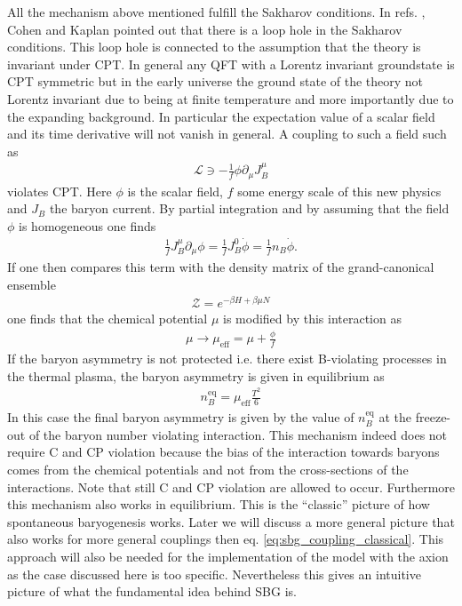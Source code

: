 \documentclass[13pt,a4paper,titlepage]{article}
\begin{document}
All the mechanism above mentioned fulfill the Sakharov conditions.
In refs. \cite{COHEN1987251}, \cite{COHEN1988913} Cohen and Kaplan pointed out that there is a loop hole in the Sakharov conditions.
This loop hole is connected to the assumption that the theory is invariant under CPT.
In general any QFT with a Lorentz invariant groundstate is CPT symmetric but in the early universe the ground state of the theory not Lorentz invariant due to being at finite temperature and more importantly
due to the expanding background. In particular the expectation value of a scalar field and its time derivative will not vanish in general. A coupling to such a field such as \cite[eq. 1.2]{COHEN1987251}
\begin{align}
    \label{eq:sbg_coupling_classical}
    \mathcal{L} \ni - \frac{1}{f} \phi \partial_\mu J^\mu_B
\end{align}
violates CPT. Here $\phi$ is the scalar field, $f$ some energy scale of this new physics and $J_B$ the baryon current.
By partial integration and by assuming that the field $\phi$ is homogeneous one finds \cite[1.3]{COHEN1987251}
\begin{align}
    \frac{1}{f} J_B^\mu \partial_\mu \phi = \frac{1}{f} J_B^0 \dot{\phi}
    = \frac{1}{f} n_B \dot{\phi}.
\end{align}
If one then compares this term with the density matrix of the grand-canonical ensemble
\begin{align}
    \mathcal{Z} = e^{-\beta H + \beta \mu N}
\end{align}
one finds that the chemical potential $\mu$ is modified by this
interaction as
\begin{align}
    \mu \to \mu_\mathrm{eff} = \mu + \frac{\phi}{f}
\end{align}
If the baryon asymmetry is not protected i.e. there exist B-violating processes in the thermal plasma, the baryon asymmetry is given in equilibrium as \cite[eq. 3.58]{the_early_universe_kolb_and_turner}
\begin{align}
    n_B^\mathrm{eq} = \mu_\mathrm{eff} \frac{T^2}{6}
\end{align}
In this case the final baryon asymmetry is given by the value of $n^\mathrm{eq}_B$ at the freeze-out of the baryon number violating interaction.
This mechanism indeed does not require C and CP violation because the bias of the interaction towards baryons comes from the chemical potentials and not from the cross-sections of the interactions.
Note that still C and CP violation are allowed to occur.
Furthermore this mechanism also works in equilibrium.
This is the ``classic'' picture of how spontaneous baryogenesis works. Later we will discuss a more general picture
that also works for more general couplings then eq. \eqref{eq:sbg_coupling_classical}.
This approach will also be needed for the implementation of the model with the axion as the case discussed here is too
specific. Nevertheless this gives an intuitive picture of what the fundamental idea behind SBG is.
\end{document}
